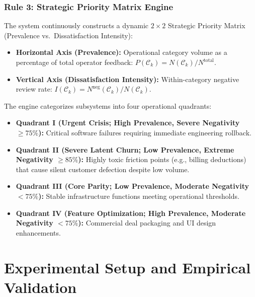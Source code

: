 \documentclass[review,12pt,authoryear]{elsarticle}
\begin{document}
\subsubsection{Rule 3: Strategic Priority Matrix Engine}
The system continuously constructs a dynamic $2 \times 2$ Strategic Priority Matrix (Prevalence vs.\ Dissatisfaction Intensity):
\begin{itemize}
    \item \textbf{Horizontal Axis (Prevalence):} Operational category volume as a percentage of total operator feedback: $P(\mathcal{C}_k) = N(\mathcal{C}_k) / N^{\text{total}}$.
    \item \textbf{Vertical Axis (Dissatisfaction Intensity):} Within-category negative review rate: $I(\mathcal{C}_k) = N^{\text{neg}}(\mathcal{C}_k) / N(\mathcal{C}_k)$.
\end{itemize}
The engine categorizes subsystems into four operational quadrants:
\begin{itemize}
    \item \textbf{Quadrant I (Urgent Crisis; High Prevalence, Severe Negativity $\ge 75\%$):} Critical software failures requiring immediate engineering rollback.
    \item \textbf{Quadrant II (Severe Latent Churn; Low Prevalence, Extreme Negativity $\ge 85\%$):} Highly toxic friction points (e.g., billing deductions) that cause silent customer defection despite low volume.
    \item \textbf{Quadrant III (Core Parity; Low Prevalence, Moderate Negativity $< 75\%$):} Stable infrastructure functions meeting operational thresholds.
    \item \textbf{Quadrant IV (Feature Optimization; High Prevalence, Moderate Negativity $< 75\%$):} Commercial deal packaging and UI design enhancements.
\end{itemize}

\section{Experimental Setup and Empirical Validation}
\label{sec:experimental_setup}
\end{document}
